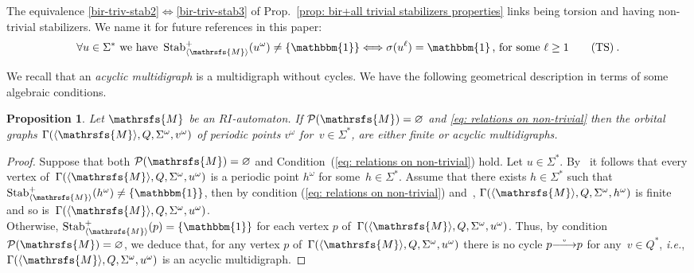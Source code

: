 \documentclass{amsart}
\newtheorem{proposition}[theorem]{Proposition}
\begin{document}
The equivalence \ref{bir-triv-stab2}$\Longleftrightarrow$\ref{bir-triv-stab3} of Prop.~\ref{prop: bir+all trivial stabilizers properties} links being torsion and having non-trivial stabilizers. We name it for future references in this paper:
\begin{equation}\label{eq: relations on non-trivial}
\forall u\in {{{\Sigma}}}^{*}\mbox{ we have }\operatorname{Stab}_{{{\langle}{{\mathrsfs{{{M}}}}}{\rangle}}}^{+}(u^{\omega})\neq \{\operatorname{\mathbbm{1}}\}\Longleftrightarrow \sigma(u^{\ell})=\operatorname{\mathbbm{1}}\mbox{, for some }\ell\ge 1 \tag{TS}
\:.\end{equation}

We recall that an \emph{acyclic multidigraph} is a multidigraph without cycles. We have the following geometrical description in terms of some algebraic conditions.
\begin{proposition}\label{prop: geo description}
Let ${{{\mathrsfs{{M}}}}}$ be an $RI$-automaton. If $\mathcal{P}({{{\mathrsfs{{M}}}}})=\varnothing$ and
\eqref{eq: relations on non-trivial}
then the orbital graphs $\Gamma({{{\langle}{{\mathrsfs{{{M}}}}}{\rangle}}},{{{Q}}}, {{{\Sigma}}}^{\omega},v^{\omega})$ of periodic points $v^{\omega}$ for~$v\in {{{\Sigma}}}^{*}$, are either finite or acyclic multidigraphs.
\end{proposition}
\begin{proof}
Suppose that both $\mathcal{P}({{{\mathrsfs{{M}}}}})=\varnothing$ and Condition~(\ref{eq: relations on non-trivial}) hold. Let $u\in {{{\Sigma}}}^{*}$. By~\cite[Lemma 2]{DaRo15} it follows that every vertex of~$\Gamma({{{\langle}{{\mathrsfs{{{M}}}}}{\rangle}}},{{{Q}}},
{{{\Sigma}}}^{\omega},u^{\omega})$ is a periodic point $h^{\omega}$ for some~$h\in {{{\Sigma}}}^{*}$. Assume that there exists $h \in {{{\Sigma}}}^{*}$ such that $\operatorname{Stab}_{{{\langle}{{\mathrsfs{{{M}}}}}{\rangle}}}^{+}(h^{\omega})\neq\{\operatorname{\mathbbm{1}}\}$, then by condition (\ref{eq: relations on non-trivial}) and~\cite[Theorem~6]{DaRo15}, $\Gamma({{{\langle}{{\mathrsfs{{{M}}}}}{\rangle}}},{{{Q}}},
{{{\Sigma}}}^{\omega},h^{\omega})$ is finite and so is~$\Gamma({{{\langle}{{\mathrsfs{{{M}}}}}{\rangle}}},{{{Q}}},
{{{\Sigma}}}^{\omega},u^{\omega})$.\\
 Otherwise, $\operatorname{Stab}_{{{\langle}{{\mathrsfs{{{M}}}}}{\rangle}}}^{+}(p)=\{\operatorname{\mathbbm{1}}\}$ for each vertex $p$ of~$\Gamma({{{\langle}{{\mathrsfs{{{M}}}}}{\rangle}}},{{{Q}}}, {{{\Sigma}}}^{\omega},u^{\omega})$. Thus, by  condition $\mathcal{P}({{{\mathrsfs{{M}}}}})=\varnothing$, we deduce that, for any vertex $p$ of~$\Gamma({{{\langle}{{\mathrsfs{{{M}}}}}{\rangle}}},{{{Q}}}, {{{\Sigma}}}^{\omega},u^{\omega})$ there is no cycle $p{\smash{\stackrel{\text{\tiny{${v}$}}}{\relbar\joinrel\longrightarrow}}} p$ for any~$v\in {{{Q}}}^{*}$, \emph{i.e.}, $\Gamma({{{\langle}{{\mathrsfs{{{M}}}}}{\rangle}}},{{{Q}}}, {{{\Sigma}}}^{\omega},u^{\omega})$ is an acyclic multidigraph.
\end{proof}
\end{document}
